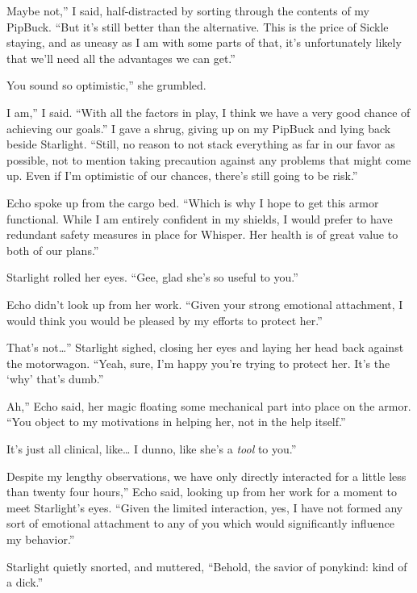 \leavevmode{}Maybe not,” I said, half-distracted by sorting through the contents of my PipBuck. “But it’s still better than the alternative. This is the price of Sickle staying, and as uneasy as I am with some parts of that, it’s unfortunately likely that we’ll need all the advantages we can get.”

\leavevmode{}You sound so optimistic,” she grumbled.

\leavevmode{}I am,” I said. “With all the factors in play, I think we have a very good chance of achieving our goals.” I gave a shrug, giving up on my PipBuck and lying back beside Starlight. “Still, no reason to not stack everything as far in our favor as possible, not to mention taking precaution against any problems that might come up. Even if I’m optimistic of our chances, there’s still going to be risk.”

Echo spoke up from the cargo bed. “Which is why I hope to get this armor functional. While I am entirely confident in my shields, I would prefer to have redundant safety measures in place for Whisper. Her health is of great value to both of our plans.”

Starlight rolled her eyes. “Gee, glad she’s so useful to you.”

Echo didn’t look up from her work. “Given your strong emotional attachment, I would think you would be pleased by my efforts to protect her.”

\leavevmode{}That’s not…” Starlight sighed, closing her eyes and laying her head back against the motorwagon. “Yeah, sure, I’m happy you’re trying to protect her. It’s the ‘why’ that’s dumb.”

\leavevmode{}Ah,” Echo said, her magic floating some mechanical part into place on the armor. “You object to my motivations in helping her, not in the help itself.”

\leavevmode{}It’s just all clinical, like… I dunno, like she’s a \textit{tool} to you.”

\leavevmode{}Despite my lengthy observations, we have only directly interacted for a little less than twenty four hours,” Echo said, looking up from her work for a moment to meet Starlight’s eyes. “Given the limited interaction, yes, I have not formed any sort of emotional attachment to any of you which would significantly influence my behavior.”

Starlight quietly snorted, and muttered, “Behold, the savior of ponykind: kind of a dick.”

